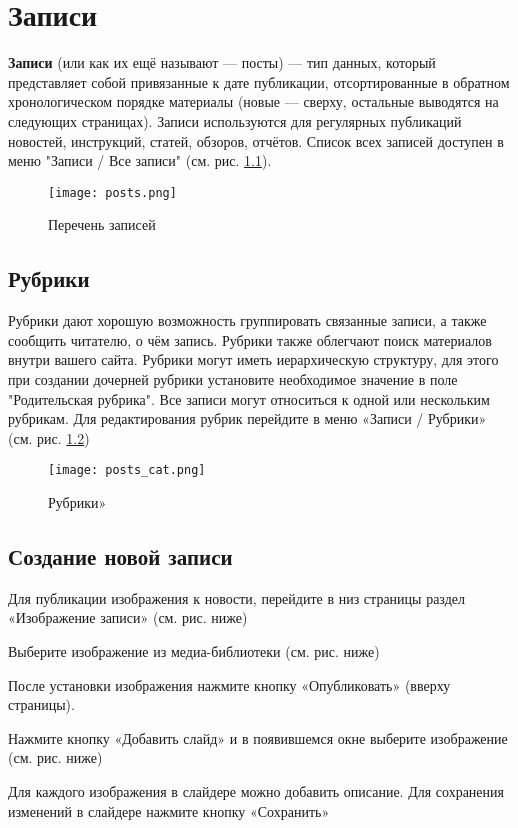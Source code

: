 \chapter{Записи}
\label{sec:chapter_posts}

\textbf{Записи} (или как их ещё называют — посты) — тип данных, который представляет собой привязанные к дате публикации, отсортированные в обратном хронологическом порядке материалы (новые — сверху, остальные выводятся на следующих страницах).
Записи используются для регулярных публикаций новостей, инструкций, статей, обзоров, отчётов. Список всех записей доступен в меню "Записи / Все записи" (см. рис. \ref{fig:pic_posts}).

\begin{figure}[htp]
    \centering
	\texttt{[image: posts.png]}
    \caption{Перечень записей}
    \label{fig:pic_posts}
\end{figure}

\section{Рубрики}
\label{sec:part_cat_posts}

Рубрики дают хорошую возможность группировать связанные записи, а также сообщить читателю, о чём запись. Рубрики также облегчают поиск материалов внутри вашего сайта. Рубрики могут иметь иерархическую структуру, для этого при создании дочерней рубрики установите необходимое значение в поле "Родительская рубрика".
Все записи могут относиться к одной или нескольким рубрикам. Для редактирования рубрик перейдите в меню «Записи / Рубрики» (см. рис. \ref{fig:pic_posts_cat})

\begin{figure}[htp]
    \centering
	\texttt{[image: posts\_cat.png]}
    \caption{Рубрики»}
    \label{fig:pic_posts_cat}
\end{figure}


\section{Создание новой записи}
\label{sec:part_new_post}

Для публикации изображения к новости, перейдите в низ страницы раздел «Изображение записи» (см. рис. ниже)




Выберите изображение из медиа-библиотеки (см. рис. ниже)




После установки изображения нажмите кнопку «Опубликовать» (вверху страницы).


Нажмите кнопку «Добавить слайд» и в появившемся окне выберите изображение (см. рис. ниже)


Для каждого изображения в слайдере можно добавить описание. Для сохранения изменений в слайдере нажмите кнопку «Сохранить»

